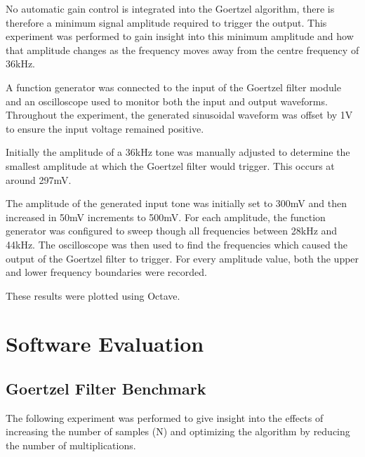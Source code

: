 No automatic gain control is integrated into the Goertzel algorithm, there is therefore a minimum signal amplitude required to trigger the output. This experiment was performed to gain insight into this minimum amplitude and how that amplitude changes as the frequency moves away from the centre frequency of 36kHz.

A function generator was connected to the input of the Goertzel filter module and an oscilloscope used to monitor both the input and output waveforms. Throughout the experiment, the generated sinusoidal waveform was offset by 1V to ensure the input voltage remained positive.

Initially the amplitude of a 36kHz tone was manually adjusted to determine the smallest amplitude at which the Goertzel filter would trigger. This occurs at around 297mV.

The amplitude of the generated input tone was initially set to 300mV and then increased in  50mV increments to 500mV. For each amplitude, the function generator was configured to sweep though all frequencies between 28kHz and 44kHz. The oscilloscope was then used to find the frequencies which caused the output of the Goertzel filter to trigger. For every amplitude value, both the upper and lower frequency boundaries were recorded.

These results were plotted using Octave.












\section{Software Evaluation}






\subsection{Goertzel Filter Benchmark}

The following experiment was performed to give insight into the effects of increasing the number of samples (N) and optimizing the algorithm by reducing the number of multiplications.

